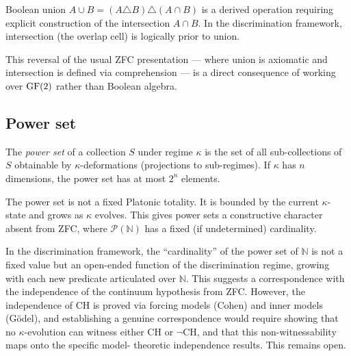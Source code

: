 \begin{corollary}
Boolean union $A \cup B = (A \triangle B) \triangle (A \cap B)$
is a derived operation requiring explicit construction of the
intersection $A \cap B$. In the discrimination framework,
intersection (the overlap cell) is logically prior to union.
\end{corollary}

\begin{remark}
This reversal of the usual ZFC presentation --- where union is
axiomatic and intersection is defined via comprehension --- is
a direct consequence of working over $\operatorname{GF}(2)$ rather than
Boolean algebra.
\end{remark}

\subsection{Power set}

\begin{definition}\label{def:powerset}
The \emph{power set} of a collection $S$ under regime $\kappa$ is
the set of all sub-collections of $S$ obtainable by
$\kappa$-deformations (projections to sub-regimes). If $\kappa$
has $n$ dimensions, the power set has at most $2^n$ elements.
\end{definition}

\begin{remark}
The power set is not a fixed Platonic totality. It is bounded by
the current $\kappa$-state and grows as $\kappa$ evolves. This
gives power sets a constructive character absent from ZFC, where
$\mathcal{P}(\mathbb{N})$ has a fixed (if undetermined)
cardinality.
\end{remark}

\begin{conjecture}\label{conj:CH}
In the discrimination framework, the ``cardinality'' of
the power set of $\mathbb{N}$ is not a fixed value but an
open-ended function of the discrimination regime, growing
with each new predicate articulated over $\mathbb{N}$.
This suggests a correspondence with the independence of
the continuum hypothesis from ZFC. However, the
independence of CH is proved via forcing models (Cohen)
and inner models (G\"{o}del), and establishing a genuine
correspondence would require showing that no
$\kappa$-evolution can witness either CH or $\neg$CH, and
that this non-witnessability maps onto the specific model-
theoretic independence results. This remains open.
\end{conjecture}

